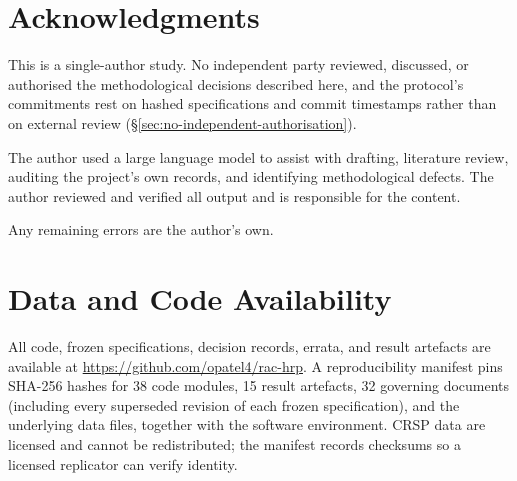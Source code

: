 \documentclass[12pt,letterpaper]{article}
\begin{document}
\section*{Acknowledgments}

This is a single-author study. No independent party reviewed, discussed, or authorised
the methodological decisions described here, and the protocol's commitments rest on
hashed specifications and commit timestamps rather than on external review
(\S\ref{sec:no-independent-authorisation}).

The author used a large language model to assist with drafting, literature review,
auditing the project's own records, and identifying methodological defects. The author
reviewed and verified all output and is responsible for the content.

Any remaining errors are the author's own.

\section*{Data and Code Availability}

All code, frozen specifications, decision records, errata, and result artefacts are
available at \url{https://github.com/opatel4/rac-hrp}. A reproducibility manifest pins
SHA-256 hashes for 38 code modules, 15 result artefacts, 32 governing documents (including every superseded revision of each frozen specification), and
the underlying data files, together with the software environment. CRSP data are
licensed and cannot be redistributed; the manifest records checksums so a licensed
replicator can verify identity.



\end{document}
